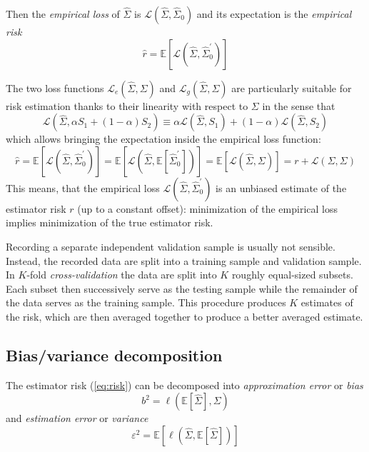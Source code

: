 Then the \emph{empirical loss} of $\hat\Sigma$ is $\mathcal L(\hat\Sigma,\hat\Sigma_0)$ and its expectation is the \emph{empirical risk}  
\begin{equation}
\hat r = \mathbb E\left[\mathcal L(\hat\Sigma,\hat\Sigma_0^\prime)\right]
\end{equation}

 The two loss functions $\mathcal L_e(\hat\Sigma,\Sigma)$ and $\mathcal L_g(\hat\Sigma,\Sigma)$ are particularly suitable for risk estimation thanks to their linearity with respect to $\Sigma$ in the sense that 
\begin{equation}
\mathcal L\left(\hat\Sigma,\alpha S_1 + (1-\alpha)S_2\right) 
\equiv 
\alpha\mathcal L(\hat \Sigma,S_1) + (1-\alpha)\mathcal L(\hat \Sigma,S_2)
\end{equation}
which allows bringing the expectation inside the empirical loss function:
\begin{equation}
\hat r = 
\mathbb E\left[ \mathcal L(\hat\Sigma, \hat\Sigma_0^\prime) \right] 
=
\mathbb E\left[ \mathcal L\left(\hat\Sigma, \mathbb E\left[\hat\Sigma_0^\prime\right]\right) \right] 
=
\mathbb E\left[ \mathcal L(\hat\Sigma, \Sigma) \right] 
= 
r + \mathcal L(\Sigma,\Sigma)
\end{equation}
This means, that the empirical loss $\mathcal L(\hat\Sigma,\hat\Sigma_0^\prime)$ is an unbiased estimate of the estimator risk $r$ (up to a constant offset): minimization of the empirical loss implies minimization of the true estimator risk. 

Recording a separate independent validation sample is usually not sensible.  Instead, the recorded data are split into a training sample and validation sample. In $K$-fold \emph{cross-validation} the data are split into $K$ roughly equal-sized subsets. Each subset then successively serve as the testing sample while the remainder of the data serves as the training sample.  This procedure produces $K$ estimates of the  risk, which are then averaged together to produce a better averaged estimate.


\subsection{Bias/variance decomposition}
The estimator risk (\autoref{eq:risk}) can be decomposed into \emph{approximation error} or \emph{bias}   
\begin{equation}
b^2 = \ell \left( \mathbb E[\hat \Sigma],\Sigma\right)
\end{equation}
and \emph{estimation error} or \emph{variance}
\begin{equation}
\varepsilon^2 = \mathbb E \left[ \ell\left(\hat \Sigma, 
\mathbb E[\hat \Sigma]\right) \right]
\end{equation}

